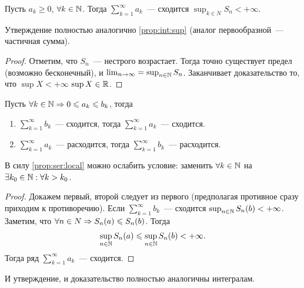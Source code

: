 \documentclass[../main.tex]{subfiles}
\begin{document}
\begin{proposition}
  Пусть $a_k \geq 0$, $\forall k \in \mathbb{N}$. Тогда $ \sum_{k=1}^{\infty} a_k $~--- сходится \nas $\sup_{k \in N} S_{n} < + \infty$. 
\end{proposition}


\begin{note}
  Утверждение полностью аналогично \ref{prop:int:sup} (аналог первообразной~--- частичная сумма). 
\end{note}


\begin{proof}
  Отметим, что $S_n$~--- нестрого возрастает. Тогда точно существует предел (возможно бесконечный), и $\lim_{n \to \infty} = \sup_{n \in \mathbb{N}} S_n$. Заканчивает доказательство то, что $\sup X < + \infty $ \nas $\sup X \in \mathbb{R}$.  
\end{proof}


\begin{proposition}
  Пусть $\forall k \in \mathbb{N} \Rightarrow 0 \leqslant a_k \leqslant b_k$, тогда 
  \begin{enumerate}
    \item $ \sum_{k=1}^{\infty} b_k  $~--- сходится, тогда $ \sum_{k=1}^{\infty} a_k $~---  сходится.
    \item $ \sum_{k=1}^{\infty} a_k $~---  расходится, тогда $ \sum_{k=1}^{\infty} b_k $~--- расходится.
  \end{enumerate} 
\end{proposition}


\begin{note}
    В силу \ref{prop:ser:local} можно ослабить условие: заменить $\forall k \in \mathbb{N}$ на $\exists k_0 \in \mathbb{N}: \forall k > k_0 $.
\end{note}


\begin{proof}
  Докажем первый, второй следует из первого (предполагая противное сразу приходим к противоречию). Если $ \sum_{k=1}^{\infty} b_k $~--- сходится \nas $\sup_{n\in\mathbb{N}} S_n(b) < +\infty$. Заметим, что $\forall n \in N \Rightarrow S_n(a) \leqslant S_n(b)$. Тогда 
  \begin{gather} 
    \sup_{n\in\mathbb{N}}S_n(a) \leqslant \sup_{n\in\mathbb{N}} S_n(b) < +\infty .
  \end{gather}  
  Тогда ряд $ \sum_{k=1}^{\infty} a_k $~---  сходится.
\end{proof}


\begin{note}
  И утверждение, и доказательство полностью аналогичны интегралам.
\end{note}
\end{document}
